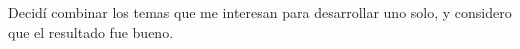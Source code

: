 \documentclass{bmcart}
\begin{document}
Decidí combinar los temas que me interesan para desarrollar uno solo, y considero que el resultado fue bueno.

















\end{document}
